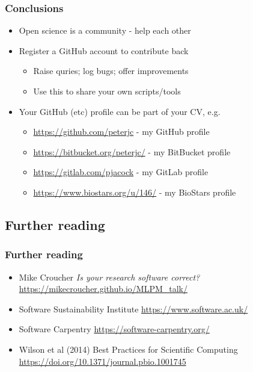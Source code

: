 \begin{frame}
  \frametitle{Conclusions}
  \begin{itemize}
    \item Open science is a community - help each other
    \item Register a GitHub account to contribute back
      \begin{itemize}
        \item Raise quries; log bugs; offer improvements
        \item Use this to share your own scripts/tools
      \end{itemize}
    \item Your GitHub (etc) profile can be part of your CV, e.g.
      \begin{itemize}
        \item \url{https://github.com/peterjc} - my GitHub profile
        \item \url{https://bitbucket.org/peterjc/} - my BitBucket profile
        \item \url{https://gitlab.com/pjacock} - my GitLab profile
        \item \url{https://www.biostars.org/u/146/} - my BioStars profile
      \end{itemize}
 \end{itemize}
\end{frame}

\subsection{Further reading}

\begin{frame}
  \frametitle{Further reading}
  \begin{itemize}

    \item Mike Croucher \emph{Is your research software correct?}
    \url{https://mikecroucher.github.io/MLPM_talk/}

    \item Software Sustainability Institute
    \url{https://www.software.ac.uk/}

    \item Software Carpentry
    \url{https://software-carpentry.org/}

    \item Wilson et al (2014) Best Practices for Scientific Computing
    \url{https://doi.org/10.1371/journal.pbio.1001745}

  \end{itemize}
\end{frame}


